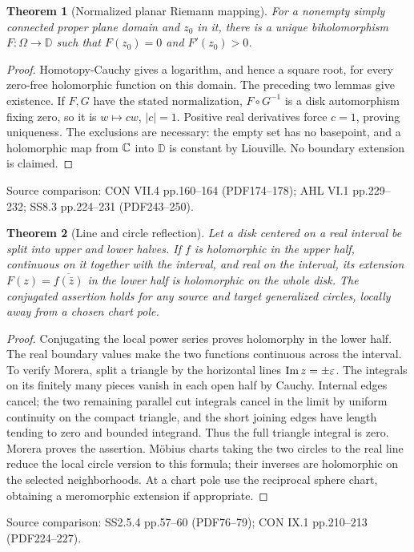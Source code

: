 \documentclass[11pt,a4paper,openany]{book}
\newtheorem{theorem}{Theorem}[chapter]
\theoremstyle{definition}
\theoremstyle{remark}\newtheorem{remark}[theorem]{Remark}
\newcommand{\D}{\mathbb D}\newcommand{\Chat}{\widehat{\mathbb C}}
\newcommand{\eps}{\varepsilon}\newcommand{\ee}{\varepsilon}
\newcommand{\family}[1]{}
\newcommand{\source}[1]{\par\begingroup\small\sffamily\color{black!65}Source comparison: #1\par\endgroup}
\begin{document}
\begin{theorem}[Normalized planar Riemann mapping]\family{D12.12.01}\label{d12:12-01}
For a nonempty simply connected proper plane domain and $z_0$ in it, there is a unique biholomorphism $F:\Omega\to\D$ such that $F(z_0)=0$ and $F'(z_0)>0$.
\end{theorem}
\begin{proof}
Homotopy-Cauchy gives a logarithm, and hence a square root, for every zero-free holomorphic function on this domain. The preceding two lemmas give existence. If $F,G$ have the stated normalization, $F\circ G^{-1}$ is a disk automorphism fixing zero, so it is $w\mapsto cw$, $|c|=1$. Positive real derivatives force $c=1$, proving uniqueness. The exclusions are necessary: the empty set has no basepoint, and a holomorphic map from $\mathbb C$ into $\D$ is constant by Liouville. No boundary extension is claimed.
\end{proof}
\source{CON VII.4 pp.160--164 (PDF174--178); AHL VI.1 pp.229--232; SS8.3 pp.224--231 (PDF243--250).}

\begin{theorem}[Line and circle reflection]\family{D12.12.04}\label{d12:12-04}
Let a disk centered on a real interval be split into upper and lower halves. If $f$ is holomorphic in the upper half, continuous on it together with the interval, and real on the interval, its extension $F(z)=\overline{f(\bar z)}$ in the lower half is holomorphic on the whole disk. The conjugated assertion holds for any source and target generalized circles, locally away from a chosen chart pole.
\end{theorem}
\begin{proof}
Conjugating the local power series proves holomorphy in the lower half. The real boundary values make the two functions continuous across the interval. To verify Morera, split a triangle by the horizontal lines $\Imm z=\pm\eps$. The integrals on its finitely many pieces vanish in each open half by Cauchy. Internal edges cancel; the two remaining parallel cut integrals cancel in the limit by uniform continuity on the compact triangle, and the short joining edges have length tending to zero and bounded integrand. Thus the full triangle integral is zero. Morera proves the assertion. M\"obius charts taking the two circles to the real line reduce the local circle version to this formula; their inverses are holomorphic on the selected neighborhoods. At a chart pole use the reciprocal sphere chart, obtaining a meromorphic extension if appropriate.
\end{proof}
\source{SS2.5.4 pp.57--60 (PDF76--79); CON IX.1 pp.210--213 (PDF224--227).}
\end{document}

